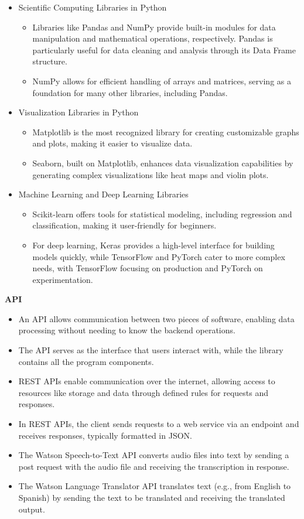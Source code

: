 \documentclass[12pt]{report} %
\begin{document}
	
		\begin{itemize}
			\item Scientific Computing Libraries in Python
				\begin{itemize}
					\item Libraries like Pandas and NumPy provide built-in modules for data manipulation and mathematical operations, respectively. Pandas is particularly useful for data cleaning and analysis through its Data Frame structure.
					\item NumPy allows for efficient handling of arrays and matrices, serving as a foundation for many other libraries, including Pandas.
				\end{itemize}
			\item Visualization Libraries in Python
				\begin{itemize}
					\item Matplotlib is the most recognized library for creating customizable graphs and plots, making it easier to visualize data.
					\item Seaborn, built on Matplotlib, enhances data visualization capabilities by generating complex visualizations like heat maps and violin plots.
				\end{itemize}
			\item Machine Learning and Deep Learning Libraries
				\begin{itemize}
					\item Scikit-learn offers tools for statistical modeling, including regression and classification, making it user-friendly for beginners.
					\item For deep learning, Keras provides a high-level interface for building models quickly, while TensorFlow and PyTorch cater to more complex needs, with TensorFlow focusing on production and PyTorch on experimentation.
				\end{itemize}		
		\end{itemize}
	
		\noindent \textbf{API}
	
		\begin{itemize}
			\item An API allows communication between two pieces of software, enabling data processing without needing to know the backend operations.
			\item The API serves as the interface that users interact with, while the library contains all the program components.
			\item REST APIs enable communication over the internet, allowing access to resources like storage and data through defined rules for requests and responses.
			\item In REST APIs, the client sends requests to a web service via an endpoint and receives responses, typically formatted in JSON.
			\item The Watson Speech-to-Text API converts audio files into text by sending a post request with the audio file and receiving the transcription in response.
			\item The Watson Language Translator API translates text (e.g., from English to Spanish) by sending the text to be translated and receiving the translated output.
		\end{itemize}
	
\end{document}
